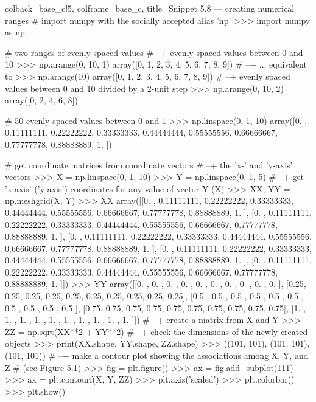 \documentclass[a4paper,11pt]{book}
\numberwithin{figure}{chapter}
\numberwithin{table}{chapter}
\begin{document}
\begin{pythoncode}[linenos=true,]{colback=base_c!5, colframe=base_c, title=\sffamily Snippet 5.8 --- creating numerical ranges}
# import numpy with the socially accepted alias 'np'
>>> import numpy as np

# two ranges of evenly spaced values
# --+ evenly spaced values between 0 and 10
>>> np.arange(0, 10, 1)
array([0, 1, 2, 3, 4, 5, 6, 7, 8, 9])
# --+ ... equivalent to
>>> np.arange(10)
array([0, 1, 2, 3, 4, 5, 6, 7, 8, 9])
# --+ evenly spaced values between 0 and 10 divided by a 2-unit step
>>> np.arange(0, 10, 2)
array([0, 2, 4, 6, 8])

# 50 evenly spaced values between 0 and 1
>>> np.linspace(0, 1, 10)
array([0.        , 0.11111111, 0.22222222, 0.33333333, 0.44444444,
       0.55555556, 0.66666667, 0.77777778, 0.88888889, 1.        ])

# get coordinate matrices from coordinate vectors 
# --+ the 'x-' and 'y-axis' vectors
>>> X = np.linspace(0, 1, 10)
>>> Y = np.linspace(0, 1, 5)
# --+ get 'x-axis' ('y-axis') coordinates for any value of vector Y (X)
>>> XX, YY = np.meshgrid(X, Y)
>>> XX 
array([[0.        , 0.11111111, 0.22222222, 0.33333333, 0.44444444,
        0.55555556, 0.66666667, 0.77777778, 0.88888889, 1.        ],
       [0.        , 0.11111111, 0.22222222, 0.33333333, 0.44444444,
        0.55555556, 0.66666667, 0.77777778, 0.88888889, 1.        ],
       [0.        , 0.11111111, 0.22222222, 0.33333333, 0.44444444,
        0.55555556, 0.66666667, 0.77777778, 0.88888889, 1.        ],
       [0.        , 0.11111111, 0.22222222, 0.33333333, 0.44444444,
        0.55555556, 0.66666667, 0.77777778, 0.88888889, 1.        ],
       [0.        , 0.11111111, 0.22222222, 0.33333333, 0.44444444,
        0.55555556, 0.66666667, 0.77777778, 0.88888889, 1.        ]])
>>> YY 
array([[0.  , 0.  , 0.  , 0.  , 0.  , 0.  , 0.  , 0.  , 0.  , 0.  ],
       [0.25, 0.25, 0.25, 0.25, 0.25, 0.25, 0.25, 0.25, 0.25, 0.25],
       [0.5 , 0.5 , 0.5 , 0.5 , 0.5 , 0.5 , 0.5 , 0.5 , 0.5 , 0.5 ],
       [0.75, 0.75, 0.75, 0.75, 0.75, 0.75, 0.75, 0.75, 0.75, 0.75],
       [1.  , 1.  , 1.  , 1.  , 1.  , 1.  , 1.  , 1.  , 1.  , 1.  ]])
# --+ create a matrix from X and Y 
>>> ZZ = np.sqrt(XX**2 + YY**2)
# --+ check the dimensions of the newly created objects 
>>> print(XX.shape, YY.shape, ZZ.shape)
>>> ((101, 101), (101, 101), (101, 101))
# --+ make a contour plot showing the associations among X, Y, and Z 
# (see Figure 5.1)
>>> fig = plt.figure()
>>> ax = fig.add_subplot(111)
>>> ax = plt.contourf(X, Y, ZZ)
>>> plt.axis('scaled')
>>> plt.colorbar()
>>> plt.show()
\end{pythoncode}
\end{document}
